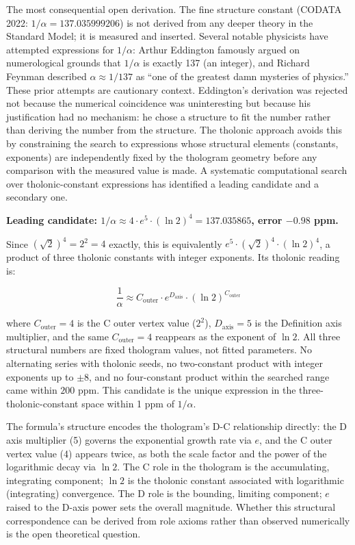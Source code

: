 \documentclass[
  11pt,
  letterpaper,
]{article}
\begin{document}
The most consequential open derivation. The fine structure constant
(CODATA 2022: \(1/\alpha = 137.035999206\)) is not derived from any
deeper theory in the Standard Model; it is measured and inserted.
Several notable physicists have attempted expressions for \(1/\alpha\):
Arthur Eddington famously argued on numerological grounds that
\(1/\alpha\) is exactly 137 (an integer), and Richard Feynman described
\(\alpha \approx 1/137\) as ``one of the greatest damn mysteries of
physics.'' These prior attempts are cautionary context. Eddington's
derivation was rejected not because the numerical coincidence was
uninteresting but because his justification had no mechanism: he chose a
structure to fit the number rather than deriving the number from the
structure. The tholonic approach avoids this by constraining the search
to expressions whose structural elements (constants, exponents) are
independently fixed by the thologram geometry before any comparison with
the measured value is made. A systematic computational search over
tholonic-constant expressions has identified a leading candidate and a
secondary one.

\textbf{Leading candidate:
\(1/\alpha \approx 4 \cdot e^5 \cdot (\ln 2)^4 = 137.035865\), error
\(-0.98\) ppm.}

Since \((\sqrt{2})^4 = 2^2 = 4\) exactly, this is equivalently
\(e^5 \cdot (\sqrt{2})^4 \cdot (\ln 2)^4\), a product of three tholonic
constants with integer exponents. Its tholonic reading is:

\[\frac{1}{\alpha} \approx C_\text{outer} \cdot e^{D_\text{axis}} \cdot (\ln 2)^{C_\text{outer}}\]

where \(C_\text{outer} = 4\) is the C outer vertex value (\(2^2\)),
\(D_\text{axis} = 5\) is the Definition axis multiplier, and the same
\(C_\text{outer} = 4\) reappears as the exponent of \(\ln 2\). All three
structural numbers are fixed thologram values, not fitted parameters. No
alternating series with tholonic seeds, no two-constant product with
integer exponents up to \(\pm 8\), and no four-constant product within
the searched range came within \(200\) ppm. This candidate is the unique
expression in the three-tholonic-constant space within 1 ppm of
\(1/\alpha\).

The formula's structure encodes the thologram's D-C relationship
directly: the D axis multiplier (5) governs the exponential growth rate
via \(e\), and the C outer vertex value (4) appears twice, as both the
scale factor and the power of the logarithmic decay via \(\ln 2\). The C
role in the thologram is the accumulating, integrating component;
\(\ln 2\) is the tholonic constant associated with logarithmic
(integrating) convergence. The D role is the bounding, limiting
component; \(e\) raised to the D-axis power sets the overall magnitude.
Whether this structural correspondence can be derived from role axioms
rather than observed numerically is the open theoretical question.
\end{document}
